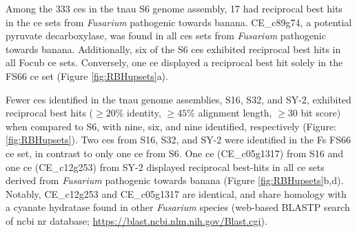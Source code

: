 Among the 333 \acp{ce} in the \ac{tnau} S6 genome assembly, 17 had reciprocal best hits in the \ac{ce} sets from \textit{Fusarium} pathogenic towards banana. CE\_c89g74, a potential pyruvate decarboxylase, was found in all \acp{ce} sets from \textit{Fusarium}  pathogenic towards banana. Additionally, six of the S6 \acp{ce} exhibited reciprocal best hits in all \ac{Focub} \ac{ce} sets. Conversely, one \ac{ce} displayed a reciprocal best hit solely in the FS66 \ac{ce} set (Figure \ref{fig:RBHupsets}a). 

Fewer \acp{ce} identified in the \ac{tnau} genome assemblies, S16, S32, and SY-2, exhibited reciprocal best hits ($\geq20\%$ identity, $\geq45\%$ alignment length, $\geq30$ bit score) when compared to S6, with nine, six, and nine identified, respectively (Figure: \ref{fig:RBHupsets}). Two \acp{ce} from S16, S32, and SY-2 were identified in the \ac{Fs} FS66 \ac{ce} set, in contrast to only one \ac{ce} from S6. One \ac{ce} (CE\_c05g1317) from S16 and one \ac{ce} (CE\_c12g253) from SY-2 displayed reciprocal best-hits in all \ac{ce} sets derived from \textit{Fusarium} pathogenic towards banana (Figure \ref{fig:RBHupsets}b,d). Notably, CE\_c12g253 and CE\_c05g1317 are identical, and share homology with a cyanate hydratase found in other \textit{Fusarium} species (web-based BLASTP search of \ac{ncbi} nr database; \href{https://blast.ncbi.nlm.nih.gov/Blast.cgi}{https://blast.ncbi.nlm.nih.gov/Bla\-st.cgi}).
 
